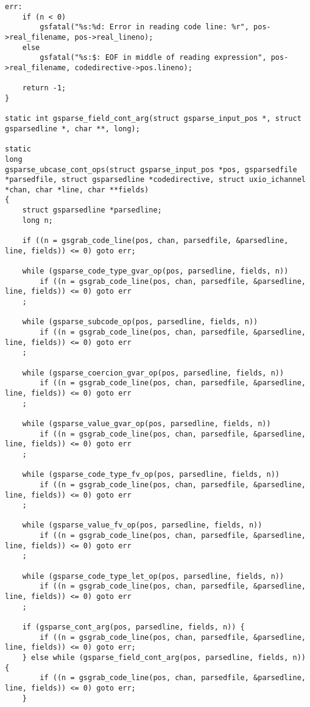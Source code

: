 \documentclass{report}
\begin{document}
\begin{verbatim}
err:
    if (n < 0)
        gsfatal("%s:%d: Error in reading code line: %r", pos->real_filename, pos->real_lineno);
    else
        gsfatal("%s:$: EOF in middle of reading expression", pos->real_filename, codedirective->pos.lineno);

    return -1;
}

static int gsparse_field_cont_arg(struct gsparse_input_pos *, struct gsparsedline *, char **, long);

static
long
gsparse_ubcase_cont_ops(struct gsparse_input_pos *pos, gsparsedfile *parsedfile, struct gsparsedline *codedirective, struct uxio_ichannel *chan, char *line, char **fields)
{
    struct gsparsedline *parsedline;
    long n;

    if ((n = gsgrab_code_line(pos, chan, parsedfile, &parsedline, line, fields)) <= 0) goto err;

    while (gsparse_code_type_gvar_op(pos, parsedline, fields, n))
        if ((n = gsgrab_code_line(pos, chan, parsedfile, &parsedline, line, fields)) <= 0) goto err
    ;

    while (gsparse_subcode_op(pos, parsedline, fields, n))
        if ((n = gsgrab_code_line(pos, chan, parsedfile, &parsedline, line, fields)) <= 0) goto err
    ;

    while (gsparse_coercion_gvar_op(pos, parsedline, fields, n))
        if ((n = gsgrab_code_line(pos, chan, parsedfile, &parsedline, line, fields)) <= 0) goto err
    ;

    while (gsparse_value_gvar_op(pos, parsedline, fields, n))
        if ((n = gsgrab_code_line(pos, chan, parsedfile, &parsedline, line, fields)) <= 0) goto err
    ;

    while (gsparse_code_type_fv_op(pos, parsedline, fields, n))
        if ((n = gsgrab_code_line(pos, chan, parsedfile, &parsedline, line, fields)) <= 0) goto err
    ;

    while (gsparse_value_fv_op(pos, parsedline, fields, n))
        if ((n = gsgrab_code_line(pos, chan, parsedfile, &parsedline, line, fields)) <= 0) goto err
    ;

    while (gsparse_code_type_let_op(pos, parsedline, fields, n))
        if ((n = gsgrab_code_line(pos, chan, parsedfile, &parsedline, line, fields)) <= 0) goto err
    ;

    if (gsparse_cont_arg(pos, parsedline, fields, n)) {
        if ((n = gsgrab_code_line(pos, chan, parsedfile, &parsedline, line, fields)) <= 0) goto err;
    } else while (gsparse_field_cont_arg(pos, parsedline, fields, n)) {
        if ((n = gsgrab_code_line(pos, chan, parsedfile, &parsedline, line, fields)) <= 0) goto err;
    }


\end{verbatim}
\end{document}
